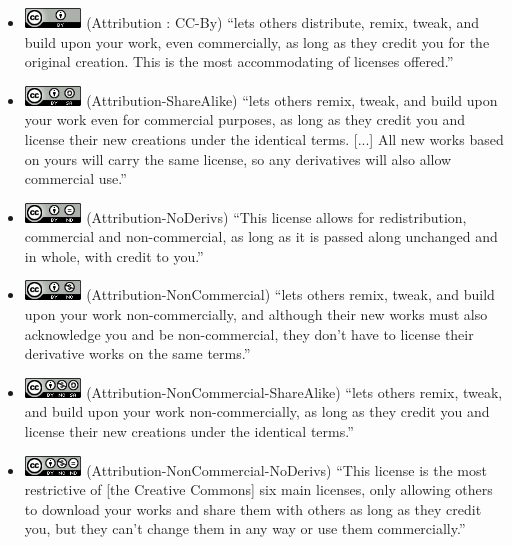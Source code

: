 \begin{itemize}
\item\includegraphics[width=15mm]{./images/CC-By_88x31.png} (Attribution : CC-By) ``lets others distribute, remix, tweak, and build upon your work, even commercially, as long as they credit you for the original creation. This is the most accommodating of licenses offered.''
\item\includegraphics[width=15mm]{./images/CC-By-SA_88x31.png} (Attribution-ShareAlike) ``lets others remix, tweak, and build upon your work even for commercial purposes, as long as they credit you and license their new creations under the identical terms. [...] All new works based on yours will carry the same license, so any derivatives will also allow commercial use.''
\item\includegraphics[width=15mm]{./images/CC-By-ND_88x31.png} (Attribution-NoDerivs) ``This license allows for redistribution, commercial and non-commercial, as long as it is passed along unchanged and in whole, with credit to you.''
\item\includegraphics[width=15mm]{./images/CC-By-NC_88x31.png} (Attribution-NonCommercial) ``lets others remix, tweak, and build upon your work non-commercially, and although their new works must also acknowledge you and be non-commercial, they don’t have to license their derivative works on the same terms.''
\item\includegraphics[width=15mm]{./images/CC-By-NC-SA_88x31.png} (Attribution-NonCommercial-ShareAlike) ``lets others remix, tweak, and build upon your work non-commercially, as long as they credit you and license their new creations under the identical terms.''
\item\includegraphics[width=15mm]{./images/CC-By-NC-ND_88x31.png} (Attribution-NonCommercial-NoDerivs) ``This license is the most restrictive of [the Creative Commons] six main licenses, only allowing others to download your works and share them with others as long as they credit you, but they can’t change them in any way or use them commercially.''
\end{itemize}


